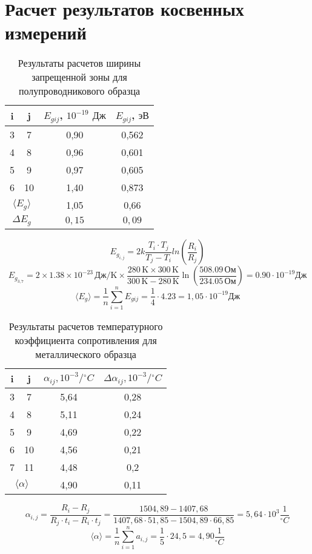 \section{Расчет результатов косвенных измерений}
\begin{table}[H]
    \centering
    \begin{tabular}{|c|c|c|c|}
    \hline
        i & j & $E_{gij}$, $10^{-19}$ $\textit{Дж}$ & $E_{gij}$, $\textit{эВ}$  \\ \hline
         3 & 7 & 0,90 & 0,562 \\ \hline
        4 & 8 & 0,96 & 0,601 \\ \hline
        5 & 9 & 0,97 & 0,605 \\ \hline
        6 & 10 & 1,40 & 0,873 \\ \hline
        \multicolumn{2}{|c|}{$\langle E_g \rangle$ }  & 1,05 & 0,66 \\ \hline
        \multicolumn{2}{|c|}{$\Delta E_g$ } & $0,15$ & $0,09$  \\ \hline
    \end{tabular}
    \caption{Результаты расчетов ширины запрещенной зоны для полупроводникового образца}
    \label{width}
\end{table}

\[
    E_{g_{i,j}} = 2k \frac{T_i \cdot T_j}{T_j-T_i}ln\left(\frac{R_i}{R_j}\right) 
\]
\[
E_{g_{3,7}} = 2 \times 1.38 \times 10^{-23} \, \text{Дж/K} \times \frac{280 \, \text{K} \times 300 \, \text{K}}{300 \, \text{K} - 280 \, \text{K}} \ln\left(\frac{508.09 \, \text{Ом}}{234.05 \, \text{Ом}}\right) = 0.90 \cdot 10^{-19} \text{Дж}
\]
$$\langle E_g \rangle = \frac{1}{n}\sum\limits_{i=1}^n{E_{gij}} = \frac{1}{4} \cdot 4.23 = 1,05 \cdot 10^{-19} \text{Дж}$$


\begin{table}[H]
    \centering
    \begin{tabular}{|c|c|c|c|}
    \hline
        i & j  & $\alpha_{ij}, 10^{-3}\text{/} {}^\circ C$ & $\Delta\alpha_{ij}, 10^{-3}\text{/} {}^\circ C$ \\ \hline
        3 & 7  & 5,64 & 0,28 \\ \hline
        4 & 8  & 5,11 & 0,24 \\ \hline
        5 & 9  & 4,69 & 0,22 \\ \hline
        6 & 10 & 4,56 & 0,21 \\ \hline
        7 & 11 & 4,48 & 0,2 \\ \hline
        \multicolumn{2}{|c|}{$\langle \alpha \rangle$} & 4,90 & 0,11 \\ \hline
    \end{tabular}
    \caption{Результаты расчетов температурного коэффициента сопротивления для металлического образца}
    \label{coeff}
\end{table}

\[
    \alpha_{i,j} = \frac{R_i - R_j}{R_j\cdot t_i - R_i\cdot t_j} = \frac{1504,89 - 1407,68}{1407,68 \cdot 51,85 - 1504,89 \cdot 66,85} = 5,64 \cdot 10^3 \frac{1}{^\circ C}
\]
\[
    \langle \alpha \rangle = \frac{1}{n} \sum\limits_{i=1}^{n}a_{i,j} = \frac{1}{5} \cdot 24,5 = 4,90 \frac{1}{^\circ C}
\]